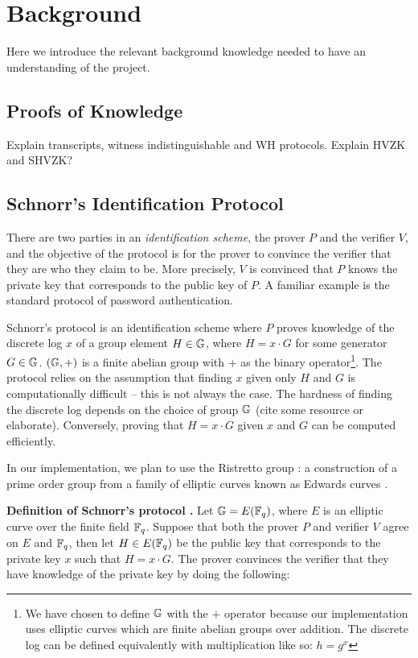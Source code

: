 \section{Background}
\label{sec:background}
Here we introduce the relevant background knowledge needed to have an understanding of the project. 

\subsection{Proofs of Knowledge}
Explain transcripts, witness indistinguishable and WH protocols. Explain HVZK and SHVZK?

\subsection{Schnorr's Identification Protocol}
There are two parties in an \textit{identification scheme}, the prover $P$ and the verifier $V$, and the objective of the protocol is for the prover to convince the verifier that they are who they claim to be. More precisely, $V$ is convinced that $P$ knows the private key that corresponds to the public key of $P$. A familiar example is the standard protocol of password authentication.

Schnorr's protocol \cite{Schnorr} is an identification scheme where $P$ proves knowledge of the discrete log $x$ of a group element $H \in \mathbb{G}$, where $H = x \cdot G$ for some generator $G \in \mathbb{G}$. $(\mathbb{G}, +)$ is a finite abelian group with $+$ as the binary operator\footnote{We have chosen to define $\mathbb{G}$ with the $+$ operator because our implementation uses elliptic curves which are finite abelian groups over addition. The discrete log can be defined equivalently with multiplication like so: $h = g^x$}. The protocol relies on the assumption that finding $x$ given only $H$ and $G$ is computationally difficult -- this is not always the case. The hardness of finding the discrete log depends on the choice of group $\mathbb{G}$ (cite some resource or elaborate). Conversely, proving that $H = x \cdot G$ given $x$ and $G$ can be computed efficiently. 

In our implementation, we plan to use the Ristretto group \cite{ristretto_web}: a construction of a prime order group from a family of elliptic curves known as Edwards curves \cite{Edwards2007}. 

\textbf{Definition of Schnorr's protocol \cite{Schnorr}.} Let $\mathbb{G} = E(\mathbb{F}_q)$, where $E$ is an elliptic curve over the finite field $\mathbb{F}_q$. Suppose that both the prover $P$ and verifier $V$ agree on $E$ and $\mathbb{F}_q$, then let $H \in E(\mathbb{F}_q)$ be the public key that corresponds to the private key $x$ such that $H = x \cdot G$. The prover convinces the verifier that they have knowledge of the private key by doing the following:

